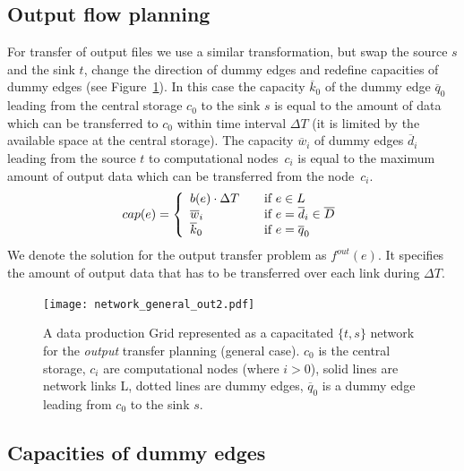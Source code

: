 \documentclass{svjour3}                     %
\begin{document}
\subsection{Output flow planning}
\label{outproblem}
For transfer of output files we use a similar transformation, but swap the
source $s$ and the sink $t$, change the direction of dummy edges and redefine
capacities of dummy edges (see Figure~\ref{general_out}). In this case the capacity $\overline{k}_{0}$ of the
dummy edge $\overline{q}_{0}$ leading from the central storage $c_0$ to the
sink $s$ is equal to the amount of data which can be transferred to $c_0$
within time interval $\Delta T$ (it is limited by the available space at the
central storage). The capacity $\overline{w}_{i}$ of dummy edges
$\overline{d}_{i}$ leading from the source $t$ to computational nodes~$c_{i}$
is equal to the maximum amount of output data which can be transferred from
the node~$c_{i}$.
%
\begin{equation}
\label{edge_cap_out}
cap(e) = \left\{ 
  \begin{array}{l l}
    b(e) \cdot \Delta T & \quad \text{if }e \in L \\
    \overline{w}_{i} & \quad \text{if } e = \overline{d}_{i} \in \overline{D}\\
    \overline{k}_{0} & \quad \text{if } e = \overline{q}_{0}
  \end{array} \right.
\end{equation}
%
We denote the solution for the output transfer problem as $f^{out}(e)$. It specifies the amount of output data that has to be transferred over each link during $\Delta T$.
\begin{figure}[t]
	\begin{center}
		\texttt{[image: network\_general\_out2.pdf]}
	\end{center}
	\caption{A data production Grid represented as a capacitated $\{t,s\}$ network for the \textit{output} transfer planning (general case). $c_{0}$ is the central storage, $c_{i}$ are computational nodes (where $i>0$), solid lines are network links L, dotted lines are dummy edges, $\overline{q}_{0}$ is a dummy edge leading from $c_{0}$ to the sink $s$. }
	\label{general_out}	
\end{figure}

\subsection{Capacities of dummy edges}

\end{document}
